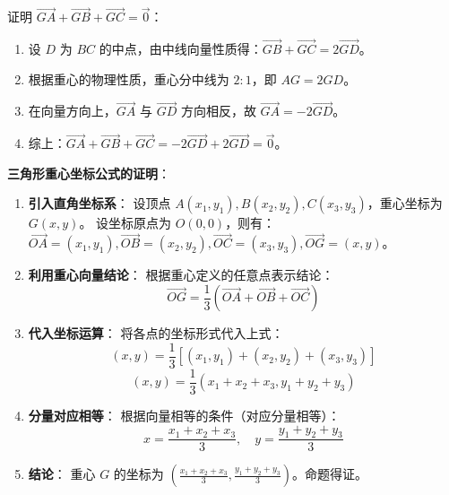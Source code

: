 \begin{proofbox}
证明 $\vec{GA} + \vec{GB} + \vec{GC} = \vec{0}$：
\begin{enumerate}
    \item 设 $D$ 为 $BC$ 的中点，由中线向量性质得：$\vec{GB} + \vec{GC} = 2\vec{GD}$。
    \item 根据重心的物理性质，重心分中线为 $2:1$，即 $AG = 2GD$。
    \item 在向量方向上，$\vec{GA}$ 与 $\vec{GD}$ 方向相反，故 $\vec{GA} = -2\vec{GD}$。
    \item 综上：$\vec{GA} + \vec{GB} + \vec{GC} = -2\vec{GD} + 2\vec{GD} = \vec{0}$。
\end{enumerate}
\end{proofbox}

\begin{proofbox}
\textbf{三角形重心坐标公式的证明}：
\begin{enumerate}
    \item \textbf{引入直角坐标系}：
    设顶点 $A(x_1, y_1), B(x_2, y_2), C(x_3, y_3)$，重心坐标为 $G(x, y)$。
    设坐标原点为 $O(0, 0)$，则有：
    $\vec{OA} = (x_1, y_1), \vec{OB} = (x_2, y_2), \vec{OC} = (x_3, y_3), \vec{OG} = (x, y)$。

    \item \textbf{利用重心向量结论}：
    根据重心定义的任意点表示结论：
    \[ \vec{OG} = \frac{1}{3}(\vec{OA} + \vec{OB} + \vec{OC}) \]

    \item \textbf{代入坐标运算}：
    将各点的坐标形式代入上式：
    \[ (x, y) = \frac{1}{3} \left[ (x_1, y_1) + (x_2, y_2) + (x_3, y_3) \right] \]
    \[ (x, y) = \frac{1}{3} (x_1 + x_2 + x_3, y_1 + y_2 + y_3) \]

    \item \textbf{分量对应相等}：
    根据向量相等的条件（对应分量相等）：
    \[ x = \frac{x_1 + x_2 + x_3}{3}, \quad y = \frac{y_1 + y_2 + y_3}{3} \]

    \item \textbf{结论}：
    重心 $G$ 的坐标为 $\left( \frac{x_1+x_2+x_3}{3}, \frac{y_1+y_2+y_3}{3} \right)$。命题得证。
\end{enumerate}
\end{proofbox}

